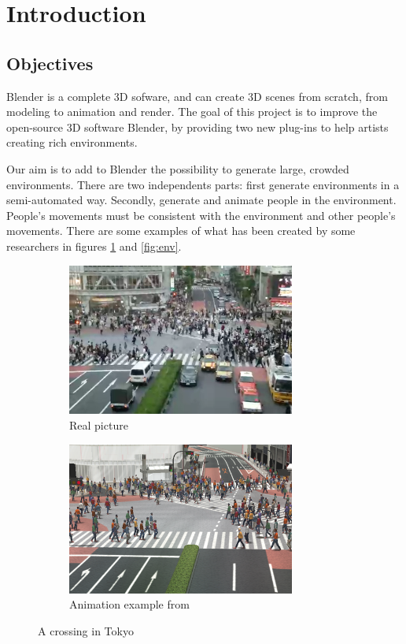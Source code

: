 \section{Introduction}

\subsection{Objectives}

Blender is a complete 3D sofware, and can create 3D scenes from
scratch, from modeling to animation and render. The goal of this
project is to improve the open-source 3D software Blender, by
providing two new plug-ins to help artists creating rich environments.

Our aim is to add to Blender the possibility to generate large,
crowded environments. There are two independents parts: first
generate environments in a semi-automated way. Secondly, generate and
animate people in the environment. People's movements must be consistent
with the environment and other people's movements. There are some
examples of what has been created by some researchers in figures
\ref{fig:crowd} and \ref{fig:env}.

\begin{figure}[h] \centering

  \begin{subfigure}[t]{0.5\textwidth}
    \includegraphics[width=7.5cm]{img/PLE_real.png}
    \caption{Real picture}
  \end{subfigure}%
  \begin{subfigure}[t]{0.5\textwidth}
    \includegraphics[width=7.5cm]{img/PLE_simu.png}
    \caption{Animation example from \cite{PLE}}
  \end{subfigure}
  \caption{A crossing in Tokyo}
  \label{fig:crowd}
\end{figure}

